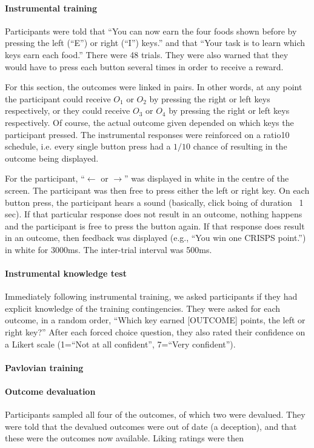 \documentclass[12pt]{article}
\begin{document}
\paragraph{Instrumental training} Participants were told that ``You can now
earn the four foods shown before by pressing the left (``E'') or right (``I'')
keys.'' and that ``Your task is to learn which keys earn each food.'' There were
48 trials. They were also warned that they would have to press each button several times in order to receive a reward. 

For this section, the outcomes were linked in pairs. In other words, at any point the participant could receive $O_1$ or $O_2$ by pressing the right or left keys respectively, or they could receive $O_3$ or $O_4$ by pressing the right or left keys respectively. Of course, the actual outcome given depended on which keys the participant pressed. The instrumental responses were reinforced on a ratio10 schedule, i.e. every single button press had a $1/10$ chance of resulting in the outcome being displayed.

For the participant, ``$\leftarrow$ or $\rightarrow$'' was displayed in
white in the centre of the screen. The participant was then free to press either the left or right key. On each button press, the participant hears a sound (basically, click boing of duration ~1 sec). If that particular response does not result in an outcome, nothing happens and the participant is free to press the button again. If that response does result in an outcome, then feedback was displayed (e.g., ``You win one CRISPS point.'') in white for 3000ms. The inter-trial interval was 500ms.

\paragraph{Instrumental knowledge test}
Immediately following instrumental training, we asked participants if they had explicit knowledge of the training contingencies. They were asked for each outcome, in a random order, ``Which key earned [OUTCOME] points, the left or right key?'' After each forced
choice question, they also rated their confidence on a Likert scale (1=``Not at
all confident'', 7=``Very confident''). 

\paragraph{Pavlovian training}

\paragraph{Outcome devaluation}
Participants sampled all four of the outcomes, of which two were devalued. They
were told that the devalued outcomes were out of date (a deception), and that
these were the outcomes now available. Liking ratings were then 
\end{document}
